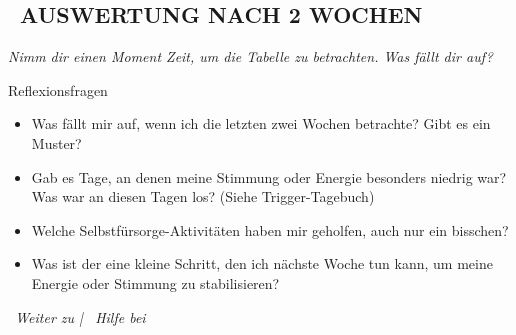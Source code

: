 \vspace{1cm}
\subsection*{\faQuestionCircle~AUSWERTUNG NACH 2 WOCHEN}
\textit{Nimm dir einen Moment Zeit, um die Tabelle zu betrachten. Was fällt dir auf?}

\begin{ctmmBlueBox}{Reflexionsfragen}
\begin{itemize}
    \item Was fällt mir auf, wenn ich die letzten zwei Wochen betrachte? Gibt es ein Muster?
    \item Gab es Tage, an denen meine Stimmung oder Energie besonders niedrig war? Was war an diesen Tagen los? (Siehe Trigger-Tagebuch)
    \item Welche Selbstfürsorge-Aktivitäten haben mir geholfen, auch nur ein bisschen?
    \item Was ist der eine kleine Schritt, den ich nächste Woche tun kann, um meine Energie oder Stimmung zu stabilisieren?
\end{itemize}
\end{ctmmBlueBox}

\vspace{1cm}
\begin{center}
\textit{\textcolor{ctmmPurple}{\faChevronRight~Weiter zu}  | \textcolor{ctmmBlue}{\faHeart~Hilfe bei} }
\end{center}
